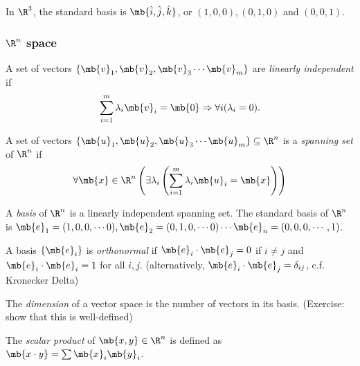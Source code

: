 \documentclass[a4paper]{article}
\begin{document}
In $\R^3$, the standard basis is $\mb{\hat{i}, \hat{j}, \hat{k}}$, or $(1, 0, 0), (0, 1, 0)$ and $(0, 0, 1)$.
\subsubsection{\texorpdfstring{$\R^n$}{Rn} space}
\begin{defi}
  A set of vectors $\{\mb{v}_1, \mb{v}_2, \mb{v}_3\cdots \mb{v}_m\}$ are \emph{linearly independent} if
\[
\sum_{i = 1}^m\lambda_i\mb{v}_i = \mb{0} \Rightarrow \forall i(\lambda_i = 0).
\]
\end{defi}
\begin{defi}
  A set of vectors $\{\mb{u}_1, \mb{u}_2, \mb{u}_3\cdots \mb{u}_m\}\subseteq \R^n$ is a \emph{spanning set} of $\R^n$ if
  \[
  \forall \mb{x} \in \R^n\left(\exists \lambda_i\left(\sum_{i = 1}^m\lambda_i\mb{u}_i = \mb{x}\right)\right)
  \]
\end{defi}

\begin{defi}
  A \emph{basis} of $\R^n$ is a linearly independent spanning set. The standard basis of $\R^n$ is $\mb{e}_1 = (1, 0, 0, \cdots 0), \mb{e}_2 = (0, 1, 0, \cdots 0)\cdots \mb{e}_n = (0, 0, 0, \cdots, 1)$.
\end{defi}

\begin{defi}
  A basis $\{\mb{e}_i\}$ is \emph{orthonormal} if $\mb{e}_i\cdot \mb{e}_j = 0$ if $i\not= j$ and $\mb{e}_i\cdot \mb{e}_i = 1$ for all $i, j$. (alternatively, $\mb{e}_i\cdot \mb{e}_j = \delta_{ij}$, c.f. Kronecker Delta)
\end{defi}

\begin{defi}
  The \emph{dimension} of a vector space is the number of vectors in its basis. (Exercise: show that this is well-defined)
\end{defi}
\begin{defi}
  The \emph{scalar product} of $\mb{x, y}\in \R^n$ is defined as $\mb{x\cdot y} = \sum \mb{x}_i\mb{y}_i$.
\end{defi}
\end{document}
